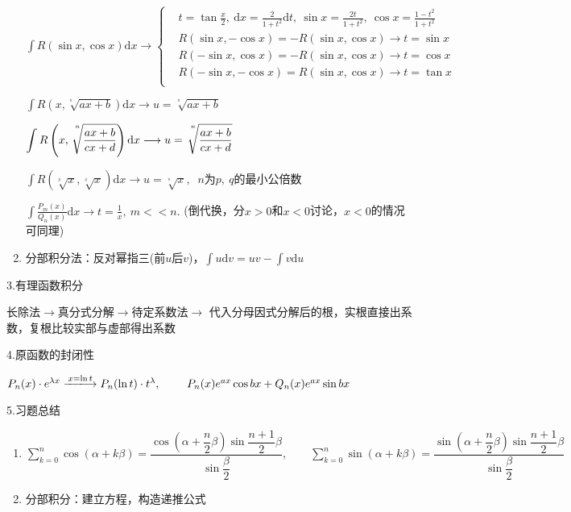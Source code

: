 \documentclass[UTF8]{ctexart}
\numberwithin{equation}{section}
\numberwithin{figure}{section}
\numberwithin{table}{section}
\newcommand\dif{\mathrm{d}}
\newcommand\no{\noindent}
\newcommand\dis{\displaystyle}
\newcommand\sumkn{\dis\sum\limits_{k=0}^n}
\newcommand\intd{\dis\int}
\begin{document}
\begin{spacing}{2}
\begin{enumerate}[itemindent=1.4em, label=(\arabic*)]
$\intd R(\sin x,\cos x)\dif x\longrightarrow 
\left\{\begin{aligned}
&t=\tan\frac{x}{2},\ 
\dif x=\frac{2}{1+t^2}\dif t,\ \sin x=\frac{2t}{1+t^2},\ 
\cos x=\frac{1-t^2}{1+t^2}\\
&R(\sin x,-\cos x)=-R(\sin x,\cos x)\longrightarrow t=\sin x\\
&R(-\sin x,\cos x)=-R(\sin x,\cos x)\longrightarrow t=\cos x\\
&R(-\sin x,-\cos x)=R(\sin x,\cos x)\longrightarrow t=\tan x\\
\end{aligned}\right.$

$\intd R\left(x,\sqrt[^n\!]{ax+b}\right)\dif x\longrightarrow u=\sqrt[^n\!]{ax+b}$

$\intd R\left(x,\sqrt[\leftroot{-3}\uproot{+16}n]
{\dfrac{ax+b}{cx+d}}\right)\dif x\longrightarrow 
u=\sqrt[\leftroot{-3}\uproot{+16}n]{\dfrac{ax+b}{cx+d}}$

$\intd R(\sqrt[^p\!]{x},\sqrt[^q\!]{x})\dif x\longrightarrow u=\sqrt[^n\!]{x},\ $
$n$为$p,\ q$的最小公倍数

$\intd\frac{P_m(x)}{Q_n(x)}\dif x\longrightarrow t=\frac{1}{x},\ m<<n.$
(倒代换，分$x>0$和$x<0$讨论，$x<0$的情况可同理)

\item 分部积分法：反对幂指三(前$u$后$v$)，$\intd u\dif v=uv-\intd v\dif u$

\end{enumerate}

\no3.有理函数积分

长除法$\longrightarrow$真分式分解$\longrightarrow$待定系数法$\longrightarrow$
代入分母因式分解后的根，实根直接出系数，复根比较实部与虚部得出系数

\no4.原函数的封闭性

$P_n(x)\cdot e^{\lambda x}\xlongrightarrow{x=\ln t}P_n(\ln t)\cdot t^\lambda,\ 
\qquad
P_n(x)e^{ax}\cos bx+Q_n(x)e^{ax}\sin bx$

\no5.习题总结

\begin{enumerate}[itemindent=1.4em, label=(\arabic*)]

\item $\sumkn \cos (\alpha +k\beta)=\dfrac{\cos\left(\alpha+\dfrac{n}{2}\beta\right)
\sin \dfrac{n+1}{2}\beta}{\sin\dfrac{\beta}{2}},
\qquad
\sumkn \sin (\alpha +k\beta)=\dfrac{\sin\left(\alpha+\dfrac{n}{2}\beta\right)
\sin \dfrac{n+1}{2}\beta}{\sin\dfrac{\beta}{2}}$

\item 分部积分：建立方程，构造递推公式


\end{enumerate}
\end{spacing}
\end{document}
